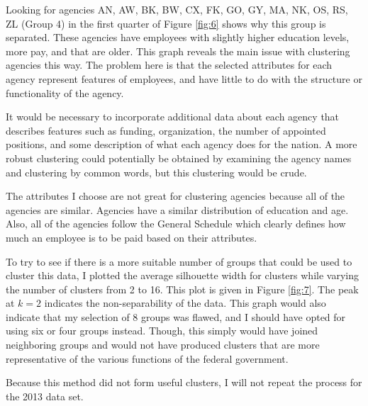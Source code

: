\documentclass{article}
\begin{document}
    \par
    Looking for agencies AN, AW, BK, BW, CX, FK, GO, GY, MA, NK, OS, RS, ZL (Group 4) in the first quarter of Figure \ref{fig:6} shows why this group is separated. These agencies have employees with slightly higher education levels, more pay, and that are older. This graph reveals the main issue with clustering agencies this way. The problem here is that the selected attributes for each agency represent features of employees, and have little to do with the structure or functionality of the agency.
    \par
    It would be necessary to incorporate additional data about each agency that describes features such as funding, organization, the number of appointed positions, and some description of what each agency does for the nation. A more robust clustering could potentially be obtained by examining the agency names and clustering by common words, but this clustering would be crude.
    \par
    The attributes I choose are not great for clustering agencies because all of the agencies are similar. Agencies have a similar distribution of education and age. Also, all of the agencies follow the General Schedule which clearly defines how much an employee is to be paid based on their attributes.
    \par
    To try to see if there is a more suitable number of groups that could be used to cluster this data, I plotted the average silhouette width for clusters while varying the number of clusters from 2 to 16. This plot is given in Figure \ref{fig:7}. The peak at $k = 2$ indicates the non-separability of the data. This graph would also indicate that my selection of 8 groups was flawed, and I should have opted for using six or four groups instead. Though, this simply would have joined neighboring groups and would not have produced clusters that are more representative of the various functions of the federal government.
    \par
    Because this method did not form useful clusters, I will not repeat the process for the 2013 data set.
\end{document}
